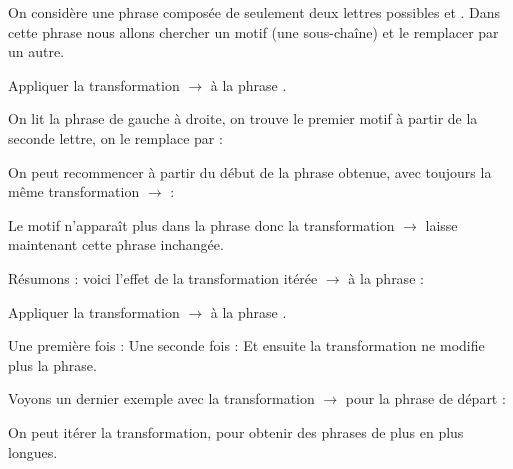 \documentclass[11pt,class=report,crop=false]{standalone}
\begin{document}
\begin{cours}

On considère une \og{}phrase\fg{} composée de seulement deux lettres possibles 
\rzero{} et \run. Dans cette phrase nous allons chercher un motif (une sous-chaîne) et le remplacer par un autre.

\begin{exemple}
Appliquer la transformation \rzero\run{} $\rightarrow$ \run\rzero{}
à la phrase \run\rzero\run\run\rzero.

On lit la phrase de gauche à droite, on trouve le premier motif \rzero\run{} à partir de la seconde lettre, on le remplace par \run\rzero{} :
\mycenterline{\run(\rzero\run)\run\rzero{} \quad $\longmapsto$ \quad \run(\run\rzero)\run\rzero}

On peut recommencer à partir du début de la phrase obtenue, avec toujours la même transformation  \rzero\run{} $\rightarrow$ \run\rzero{} :
\mycenterline{\run\run(\rzero\run)\rzero{}  \quad $\longmapsto$ \quad \run\run(\run\rzero)\rzero}

Le motif \rzero\run{} n'apparaît plus dans la phrase \run\run\run\rzero\rzero{} donc
la transformation \rzero\run{} $\rightarrow$ \run\rzero{} laisse maintenant cette phrase inchangée.

Résumons : voici l'effet de la transformation itérée \rzero\run{} $\rightarrow$ \run\rzero{} à la phrase \run\rzero\run\run\rzero{} :
\mycenterline{\run\rzero\run\run\rzero{}  \quad $\longmapsto$ \quad \run\run\rzero\run\rzero{} \quad $\longmapsto$ \quad \run\run\run\rzero\rzero}
\end{exemple}

\begin{exemple}
Appliquer la transformation \rzero\rzero\run{} $\rightarrow$ \run\run\rzero\rzero{}
à la phrase \rzero\rzero\run\run.

Une première fois :
\mycenterline{(\rzero\rzero\run)\run{}  \quad $\longmapsto$ \quad (\run\run\rzero\rzero)\run}
Une seconde fois :
\mycenterline{\run\run(\rzero\rzero\run)  \quad $\longmapsto$ \quad \run\run(\run\run\rzero\rzero)}
Et ensuite la transformation ne modifie plus la phrase.
\end{exemple}

\begin{exemple}
Voyons un dernier exemple avec la transformation \rzero\run{} $\rightarrow$ \run\run\rzero\rzero{} pour la phrase de départ \rzero\rzero\rzero\run{}: 
\mycenterline{
\rzero\rzero\rzero\run{} \quad $\longmapsto$ \quad 
\rzero\rzero\run\run\rzero\rzero{} \quad $\longmapsto$ \quad 
\rzero\run\run\rzero\rzero\run\rzero\rzero{} \quad $\longmapsto$ \quad 
\run\run\rzero\rzero\run\rzero\rzero\run\rzero\rzero{} \quad $\longmapsto$ \quad $\cdots$}

On peut itérer la transformation, pour obtenir des phrases de plus en plus longues.
\end{exemple}


\end{cours}
\end{document}
